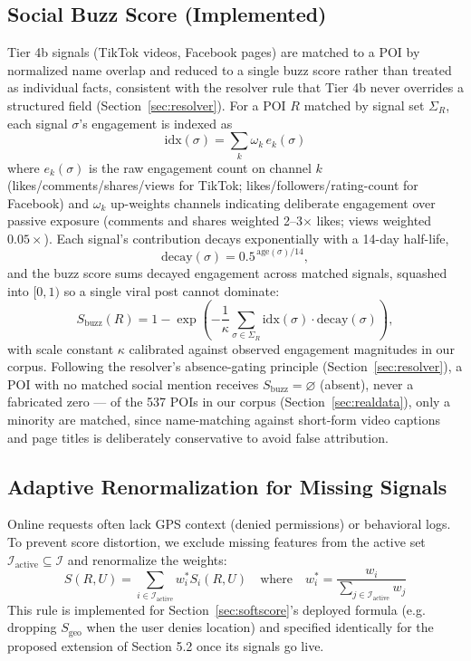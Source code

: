\documentclass[acmsmall,screen]{acmart}
\begin{document}
\subsection{Social Buzz Score (Implemented)}
\label{sec:buzz}
Tier 4b signals (TikTok videos, Facebook pages) are matched to a POI by normalized name overlap and reduced to a single buzz score rather than treated as individual facts, consistent with the resolver rule that Tier 4b never overrides a structured field (Section~\ref{sec:resolver}). For a POI $R$ matched by signal set $\Sigma_R$, each signal $\sigma$'s engagement is indexed as
\begin{equation}
\text{idx}(\sigma) = \sum_{k} \omega_k \, e_k(\sigma)
\end{equation}
where $e_k(\sigma)$ is the raw engagement count on channel $k$ (likes/comments/shares/views for TikTok; likes/followers/rating-count for Facebook) and $\omega_k$ up-weights channels indicating deliberate engagement over passive exposure (comments and shares weighted 2--3$\times$ likes; views weighted $0.05\times$). Each signal's contribution decays exponentially with a 14-day half-life,
\begin{equation}
\text{decay}(\sigma) = 0.5^{\,\text{age}(\sigma)/14},
\end{equation}
and the buzz score sums decayed engagement across matched signals, squashed into $[0,1)$ so a single viral post cannot dominate:
\begin{equation}
S_{\text{buzz}}(R) = 1 - \exp\left(-\frac{1}{\kappa}\sum_{\sigma \in \Sigma_R} \text{idx}(\sigma)\cdot\text{decay}(\sigma)\right),
\end{equation}
with scale constant $\kappa$ calibrated against observed engagement magnitudes in our corpus. Following the resolver's absence-gating principle (Section~\ref{sec:resolver}), a POI with no matched social mention receives $S_{\text{buzz}} = \varnothing$ (absent), never a fabricated zero — of the 537 POIs in our corpus (Section~\ref{sec:realdata}), only a minority are matched, since name-matching against short-form video captions and page titles is deliberately conservative to avoid false attribution.

\subsection{Adaptive Renormalization for Missing Signals}
Online requests often lack GPS context (denied permissions) or behavioral logs. To prevent score distortion, we exclude missing features from the active set $\mathcal{I}_{\text{active}} \subseteq \mathcal{I}$ and renormalize the weights:
\begin{equation}
S(R, U) = \sum_{i \in \mathcal{I}_{\text{active}}} w_i^* S_i(R, U) \quad \text{where} \quad w_i^* = \frac{w_i}{\sum_{j \in \mathcal{I}_{\text{active}}} w_j}
\end{equation}
This rule is implemented for Section~\ref{sec:softscore}'s deployed formula (e.g. dropping $S_{\text{geo}}$ when the user denies location) and specified identically for the proposed extension of Section 5.2 once its signals go live.
\end{document}
